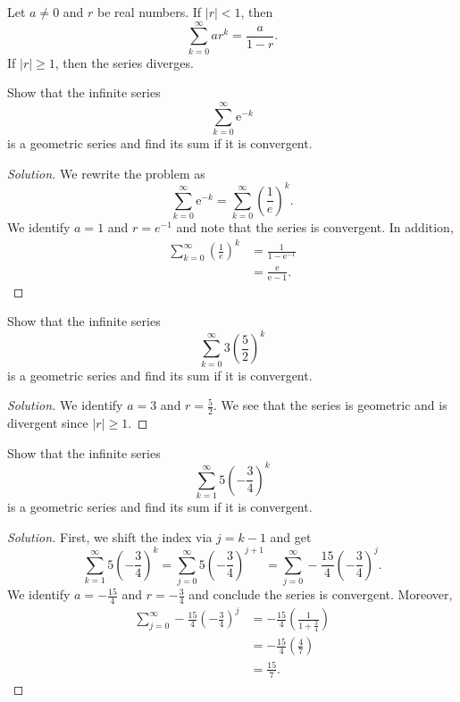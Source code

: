 \documentclass[compacto,10pt,comentarios]{aleph-notas}
\begin{document}
\begin{teo}
    Let $a \neq 0$ and $r$ be real numbers. If $|r| < 1$, then
    $$
        \sum_{k=0}^{\infty} a r^{k} = \frac{a}{1 - r}.
    $$
    If $|r| \geq 1$, then the series diverges.
\end{teo}

\begin{ejer}
    Show that the infinite series
    $$
        \sum_{k=0}^{\infty} \mathrm{e}^{-k}
    $$
    is a geometric series and find its sum if it is convergent.
\end{ejer}
\begin{proof}[Solution]
    We rewrite the problem as
    $$
        \sum_{k=0}^{\infty} \mathrm{e}^{-k} = \sum_{k=0}^{\infty} \left( \frac{1}{e} \right)^{k}.
    $$
    We identify $a = 1$ and $r = e^{-1}$ and note that the series is convergent. In addition,
    \begin{align*}
        \sum_{k=0}^{\infty} \left( \frac{1}{e} \right)^{k}
        & = \frac{1}{1 - \mathrm{e}^{-1}} \\
        & = \frac{\mathrm{e}}{\mathrm{e}-1}.
    \end{align*}
\end{proof}

\begin{ejer}
    Show that the infinite series
    $$
        \sum_{k=0}^{\infty} 3\left(\frac{5}{2}\right)^{k}
    $$
    is a geometric series and find its sum if it is convergent.
\end{ejer}
\begin{proof}[Solution]
    We identify $a = 3$ and $r = \frac{5}{2}$. We see that the series is geometric and is divergent since $|r| \geq 1$.
\end{proof}

\begin{ejer}
    Show that the infinite series
    $$
        \sum_{k=1}^{\infty} 5 \left( - \frac{3}{4} \right)^{k}
    $$
    is a geometric series and find its sum if it is convergent.
\end{ejer}
\begin{proof}[Solution]
    First, we shift the index via $j = k - 1$ and get
    $$
    \sum_{k=1}^{\infty} 5 \left( - \frac{3}{4} \right)^{k}
    = \sum_{j=0}^{\infty} 5 \left( - \frac{3}{4} \right)^{j+1}
    = \sum_{j=0}^{\infty} -\frac{15}{4} \left( - \frac{3}{4} \right)^{j}.
    $$
    We identify $a = -\frac{15}{4}$ and $r = -\frac{3}{4}$ and conclude the series is convergent. Moreover,
    \begin{align*}
    \sum_{j=0}^{\infty} -\frac{15}{4} \left( - \frac{3}{4} \right)^{j}
    & = -\frac{15}{4} \left( \frac{1}{1 + \frac{3}{4}} \right) \\
    & = -\frac{15}{4} \left( \frac{4}{7} \right) \\
    & = \frac{15}{7}.
    \end{align*}
\end{proof}
\end{document}
